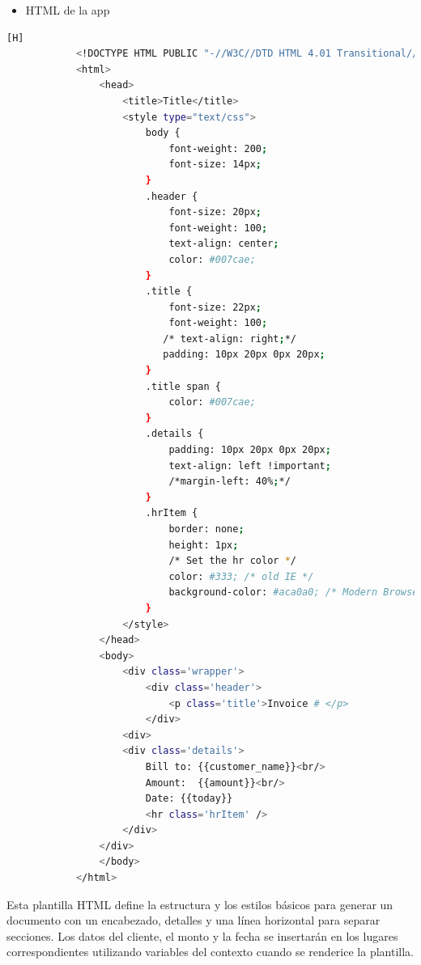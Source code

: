 \documentclass{article}
\begin{document}
         \begin{itemize}
            \item HTML de la app
        \end{itemize}
        \begin{lstlisting}[language=bash,caption={Archivo pdf/templates/invoice.html}][H]
            <!DOCTYPE HTML PUBLIC "-//W3C//DTD HTML 4.01 Transitional//EN" "http://www.w3.org/TR/html4/loose.dtd">
            <html>
                <head>
                    <title>Title</title>
                    <style type="text/css">
                        body {
                            font-weight: 200;
                            font-size: 14px;
                        }
                        .header {
                            font-size: 20px;
                            font-weight: 100;
                            text-align: center;
                            color: #007cae;
                        }
                        .title {
                            font-size: 22px;
                            font-weight: 100;
                           /* text-align: right;*/
                           padding: 10px 20px 0px 20px;  
                        }
                        .title span {
                            color: #007cae;
                        }
                        .details {
                            padding: 10px 20px 0px 20px;
                            text-align: left !important;
                            /*margin-left: 40%;*/
                        }
                        .hrItem {
                            border: none;
                            height: 1px;
                            /* Set the hr color */
                            color: #333; /* old IE */
                            background-color: #aca0a0; /* Modern Browsers */
                        }
                    </style>
                </head>
                <body>
                    <div class='wrapper'>
                        <div class='header'>
                            <p class='title'>Invoice # </p>
                        </div>
                    <div>
                    <div class='details'>
                        Bill to: {{customer_name}}<br/>
                        Amount:  {{amount}}<br/>
                        Date: {{today}}
                        <hr class='hrItem' />
                    </div>
                </div>
                </body>
            </html>
	\end{lstlisting}
        Esta plantilla HTML define la estructura y los estilos básicos para generar un documento con un encabezado, detalles y una línea horizontal para separar secciones. Los datos del cliente, el monto y la fecha se insertarán en los lugares correspondientes utilizando variables del contexto cuando se renderice la plantilla.\newline
\end{document}

